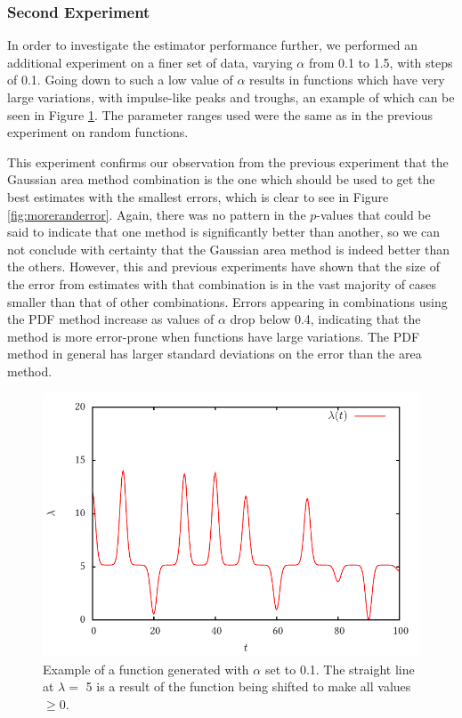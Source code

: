 \documentclass[a4paper,11pt]{article}
\begin{document}
\subsubsection{Second Experiment}
\label{sec-8-2-2}

In order to investigate the estimator performance further, we performed an
additional experiment on a finer set of data, varying $\alpha$ from 0.1 to 1.5,
with steps of 0.1. Going down to such a low value of $\alpha$ results in
functions which have very large variations, with impulse-like peaks and troughs,
an example of which can be seen in Figure \ref{fig:smallalpha}. The parameter
ranges used were the same as in the previous experiment on random functions.

This experiment confirms our observation from the previous experiment that the
Gaussian area method combination is the one which should be used to get the best
estimates with the smallest errors, which is clear to see in Figure
\ref{fig:moreranderror}. Again, there was no pattern in the $p$-values that
could be said to indicate that one method is significantly better than another,
so we can not conclude with certainty that the Gaussian area method is indeed
better than the others. However, this and previous experiments have shown that
the size of the error from estimates with that combination is in the vast
majority of cases smaller than that of other combinations. Errors appearing in
combinations using the PDF method increase as values of $\alpha$ drop below 0.4,
indicating that the method is more error-prone when functions have large
variations. The PDF method in general has larger standard deviations on the
error than the area method.
\begin{center}
\begin{figure}
\includegraphics{smallalpha}
\caption{Example of a function generated with $\alpha$ set to 0.1. The straight
line at $\lambda=$ 5 is a result of the function being shifted to make all values
$\geq 0$.}
\label{fig:smallalpha}
\end{figure}
\end{center}
\end{document}
